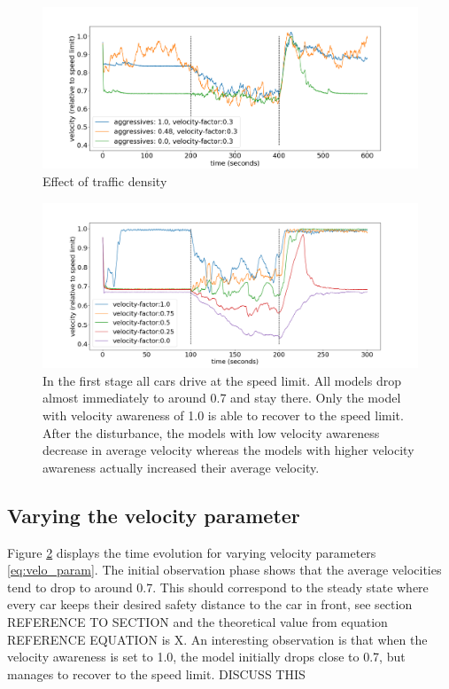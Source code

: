 \documentclass[11pt,a4paper,twocolumn]{article}
\begin{document}
\begin{figure}[ht!]     
      \centering
       \includegraphics[scale=0.35]{figs/velocity_over_time_aggressive.png}
       \caption{Effect of traffic density }
       \label{fig:vel_agg_over_time}
 \end{figure}
\begin{figure}[ht!]
    \centering
      \includegraphics[scale=0.35]{figs/velocity_over_time.png}
      \caption{In the first stage all cars drive at the speed limit. All models drop almost immediately to around 0.7 and stay there. Only the model with velocity awareness of 1.0 is able to recover to the speed limit. After the disturbance, the models with low velocity awareness decrease in average velocity whereas the models with higher velocity awareness actually increased their average velocity.}
      \label{fig:vel_over_time}
\end{figure}
\subsection{Varying the velocity parameter}
Figure \ref{fig:vel_over_time} displays the time evolution for varying velocity parameters \eqref{eq:velo_param}. The initial observation phase shows that the average velocities tend to drop to around 0.7.
This should correspond to the steady state where every car keeps their desired safety distance to the car in front, see section REFERENCE TO SECTION and the theoretical value from equation REFERENCE EQUATION is X.
An interesting observation is that when the velocity awareness is set to 1.0, the model initially drops close to 0.7, but manages to recover to the speed limit. DISCUSS THIS
\end{document}
